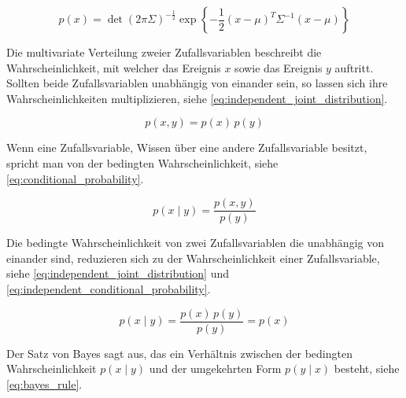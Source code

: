 \begin{equation}
p(x) = \operatorname{det}{\left( 2 \pi \Sigma \right)}^{-\frac12}  \exp{ \left\{ -\frac12 (x - \mu)^T \Sigma^{-1} (x - \mu) \right\} } \label{eq:multivariate_normal_distribution}
\end{equation}

Die multivariate Verteilung zweier Zufallsvariablen beschreibt die Wahrscheinlichkeit, mit welcher das Ereignis $x$ sowie das Ereignis $y$ auftritt. Sollten beide Zufallsvariablen unabhängig von einander sein, so lassen sich ihre Wahrscheinlichkeiten multiplizieren, siehe \autoref{eq:independent_joint_distribution}.

\begin{equation}
p(x, y) = p(x) \, p(y) \label{eq:independent_joint_distribution}
\end{equation}

Wenn eine Zufallsvariable, Wissen über eine andere Zufallsvariable besitzt, spricht man von der bedingten Wahrscheinlichkeit, siehe \autoref{eq:conditional_probability}.



\begin{equation}
p(x \mid y) = \frac{p(x, y)}{p(y)} \label{eq:conditional_probability}
\end{equation}

Die bedingte Wahrscheinlichkeit von zwei Zufallsvariablen die unabhängig von einander sind, reduzieren sich zu der Wahrscheinlichkeit einer Zufallsvariable, siehe \autoref{eq:independent_joint_distribution} und \autoref{eq:independent_conditional_probability}.

\begin{equation}
p(x \mid y) = \frac{p(x) \, p(y)}{p(y)} = p(x) \label{eq:independent_conditional_probability}
\end{equation}

Der Satz von Bayes sagt aus, das ein Verhältnis zwischen der bedingten Wahrscheinlichkeit $p(x \mid y)$ und der umgekehrten Form $p(y \mid x)$ besteht, siehe \autoref{eq:bayes_rule}.

